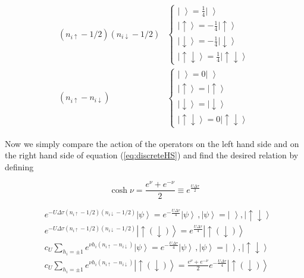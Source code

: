 \documentclass[10pt, twocolumn, twoside]{article}
\begin{document}
\begin{equation}
\begin{split}
(n_{i\uparrow} - 1/2 ) (n_{i\downarrow} - 1/2 )&
\begin{cases}
\left| \, \, \right\rangle = \frac{1}{4} \left| \, \, \right\rangle \\
\left| \uparrow \right\rangle = -\frac{1}{4} \left| \uparrow \right\rangle \\
\left| \downarrow \right\rangle = -\frac{1}{4} \left| \downarrow \right\rangle \\
\left| \uparrow \downarrow \right\rangle = \frac{1}{4} \left| \uparrow \downarrow \right\rangle
\end{cases}\\
(n_{i\uparrow} - n_{i\downarrow} )&
\begin{cases}
\left| \, \, \right\rangle = 0\left| \, \, \right\rangle \\
\left| \uparrow \right\rangle = \left| \uparrow \right\rangle \\
\left| \downarrow \right\rangle = \left| \downarrow \right\rangle \\
\left| \uparrow \downarrow \right\rangle = 0 \left| \uparrow \downarrow \right\rangle
\end{cases}
\end{split}
\end{equation}

Now we simply compare the action of the operators on the left hand side and on the right hand side of equation (\ref{eq:discreteHS}) and find the desired relation by defining

\begin{equation}
\cosh \nu =  \frac{e^\nu + e^{-\nu} }{2} \equiv e^{\frac{U\Delta \tau}{2}}
\end{equation}

\begin{equation}
\begin{split}
&e^{-U \Delta\tau (n_{i\uparrow} - 1/2 ) (n_{i\downarrow} - 1/2 )} \left| \psi \right\rangle = e^{-\frac{U\Delta \tau}{4}} \left| \psi \right\rangle \, , \left| \psi \right\rangle = \left| \, \, \right\rangle, \left| \uparrow \downarrow \right\rangle \\
&e^{-U \Delta\tau (n_{i\uparrow} - 1/2 ) (n_{i\downarrow} - 1/2 )} \left| \uparrow (\downarrow) \right\rangle = e^{\frac{U\Delta \tau}{4}} \left| \uparrow (\downarrow) \right\rangle \\
&c_U \sum_{h_i = \pm 1} e^{\nu h_i (n_{i\uparrow} - n_{i\downarrow} )} \left| \psi \right\rangle = e^{-\frac{U\Delta \tau}{4}} \left| \psi \right\rangle \, , \left| \psi \right\rangle = \left| \, \, \right\rangle, \left| \uparrow \downarrow \right\rangle \\
&c_U \sum_{h_i = \pm 1} e^{\nu h_i (n_{i\uparrow} - n_{i\downarrow} )} \left| \uparrow (\downarrow) \right\rangle= \frac{e^\nu + e^{-\nu}}{2} e^{-\frac{U\Delta \tau}{4}}  \left| \uparrow (\downarrow) \right\rangle
\end{split}
\end{equation}
\end{document}
